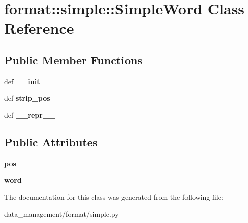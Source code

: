 \hypertarget{classformat_1_1simple_1_1SimpleWord}{
\section{format::simple::SimpleWord Class Reference}
\label{classformat_1_1simple_1_1SimpleWord}
}
\subsection*{Public Member Functions}
\begin{DoxyCompactItemize}
\item 
\hypertarget{classformat_1_1simple_1_1SimpleWord_a05af4dcd185fcff41b74e8509e302968}{
def {\bfseries \_\-\_\-init\_\-\_\-}}
\label{classformat_1_1simple_1_1SimpleWord_a05af4dcd185fcff41b74e8509e302968}

\item 
\hypertarget{classformat_1_1simple_1_1SimpleWord_a8802d7ba16fd5ab0861358966f5d7236}{
def {\bfseries strip\_\-pos}}
\label{classformat_1_1simple_1_1SimpleWord_a8802d7ba16fd5ab0861358966f5d7236}

\item 
\hypertarget{classformat_1_1simple_1_1SimpleWord_ac6f89962d6a259096b0e4d0ad0a356cb}{
def {\bfseries \_\-\_\-repr\_\-\_\-}}
\label{classformat_1_1simple_1_1SimpleWord_ac6f89962d6a259096b0e4d0ad0a356cb}

\end{DoxyCompactItemize}
\subsection*{Public Attributes}
\begin{DoxyCompactItemize}
\item 
\hypertarget{classformat_1_1simple_1_1SimpleWord_aa1abf715e954b0daf07046fc8ca9f768}{
{\bfseries pos}}
\label{classformat_1_1simple_1_1SimpleWord_aa1abf715e954b0daf07046fc8ca9f768}

\item 
\hypertarget{classformat_1_1simple_1_1SimpleWord_ae981daca0c0f5e82d6e9e745ac5a09e3}{
{\bfseries word}}
\label{classformat_1_1simple_1_1SimpleWord_ae981daca0c0f5e82d6e9e745ac5a09e3}

\end{DoxyCompactItemize}


The documentation for this class was generated from the following file:\begin{DoxyCompactItemize}
\item 
data\_\-management/format/simple.py\end{DoxyCompactItemize}
